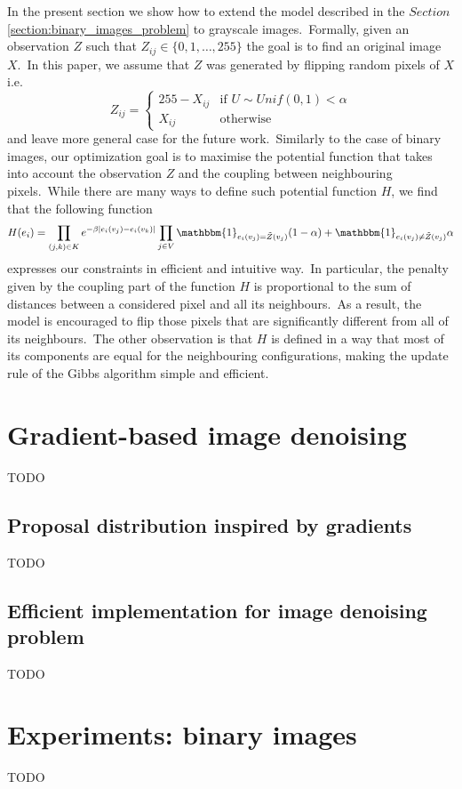 \documentclass[a4paper, 11pt, onecolumn, openany, titlepage]{report}
\newcommand\numberedchapter[1]{\setlength\topskip{3cm}\chapter{#1}\setlength\topskip{0cm}}
\theoremstyle{default_theorem_style}\newtheorem{theorem}{Theorem}
\theoremstyle{default_theorem_style}\newtheorem{definition}{Definition}
\begin{document}
In the present section we show how to extend the model described in the $Section$ \ref{section:binary_images_problem}
to grayscale images.\ Formally, given an observation $Z$ such that $Z_{ij} \in \{0, 1, \dots, 255\}$ the goal is to
find an original image $X$.\ In this paper, we assume that $Z$ was generated by flipping random pixels of $X$ i.e.
$$
Z_{ij} =
\begin{cases}
  255 - X_{ij} &\text{if $U \sim Unif(0, 1) < \alpha$}\\
  X_{ij} &\text{otherwise}
\end{cases}
$$
and leave more general case for the future work.\ Similarly to the case of binary images, our optimization goal is to
maximise the potential function that takes into account the observation $Z$ and the coupling between neighbouring
pixels.\ While there are many ways to define such potential function $H$, we find that the following function
$$
H(e_i) = \prod\limits_{(j, k) \in K} e^{-\beta |e_i(v_j) - e_i(v_k)|}
\prod\limits_{j \in V} \mathbbm{1}_{e_i(v_j) = \tilde{Z}(v_j)}(1 - \alpha) +
\mathbbm{1}_{e_i(v_j) \neq \tilde{Z}(v_j)}\alpha
$$
expresses our constraints in efficient and intuitive way.\ In particular, the penalty given by the coupling part of
the function $H$ is proportional to the sum of distances between a considered pixel and all its neighbours.\ As a
result, the model is encouraged to flip those pixels that are significantly different from all of its
neighbours.\ The other observation is that $H$ is defined in a way that most of its components are equal for the
neighbouring configurations, making the update rule of the Gibbs algorithm simple and efficient.

\numberedchapter{Gradient-based image denoising}

TODO

\section{Proposal distribution inspired by gradients}

TODO

\section{Efficient implementation for image denoising problem}

TODO

\numberedchapter{Experiments: binary images}

TODO
\end{document}
